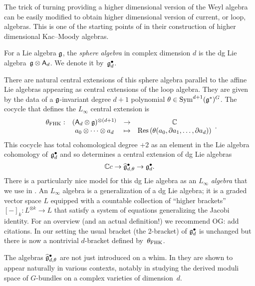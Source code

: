 \documentclass[11pt]{amsart}
\def\owen#1{{\textcolor{violet!50!black}{OG: {#1}}}}
\begin{document}
The trick of turning providing a higher dimensional version of the Weyl algebra can be easily modified to obtain higher dimensional version of current, or loop, algebras. 
This is one of the starting points of \cite{FHK} in their construction of higher dimensional Kac--Moody algebras. 

\begin{dfn}
\label{dfn:sphere}
For a Lie algebra $\mathfrak g$, the {\em sphere algebra} in complex dimension $d$ is the dg Lie algebra~$\mathfrak g \otimes \mathsf A_d$.
We denote it by~$\mathfrak g^\bullet_d$.
\end{dfn}

There are natural central extensions of this sphere algebra 
parallel to the affine Lie algebras appearing as central extensions of the loop algebra.
They are given by the data of a $\mathfrak g$-invariant degree $d+1$ polynomial $\theta \in \operatorname{Sym}^{d+1}(\mathfrak g^*)^G$.
The cocycle that defines the $L_\infty$ central extension is
\[
\label{fhk cocycle}
\begin{array}{cccc}
\theta_{\rm FHK} : & (\mathsf A_d \otimes \mathfrak g)^{\otimes (d+1)} & \to & \mathbb C\\ 
& a_0 \otimes \cdots \otimes a_d & \mapsto & {\rm Res} \left(\theta(a_0,\partial a_1,\ldots,\partial a_d)\right)
\end{array}.
\]
This cocycle has total cohomological degree $+2$ as an element in the Lie algebra cohomology of $\mathfrak g^\bullet_{d}$ and so determines a central extension of dg Lie algebras
\[
\mathbb C c \to \widehat{\mathfrak g}^\bullet_{d, \theta} \to \mathfrak g^\bullet_d .
\]
There is a particularly nice model for this dg Lie algebra as an $L_\infty$ \textit{algebra} that we use in \cite{GWkm}.
An $L_\infty$ algebra is a generalization of a dg Lie algebra;
it is a graded vector space $L$ equipped with a countable collection of ``higher brackets'' $[-]_k \colon L^{\otimes k} \to L$ that satisfy a system of equations generalizing the Jacobi identity.
For an overview (and an actual definition!) we recommend \owen{add citations}.
In our setting the usual bracket (the 2-bracket) of $\mathfrak g^\bullet_d$ is unchanged but there is now a nontrivial $d$-bracket defined by~$\theta_{\rm FHK}$.

The algebras $\widehat{\mathfrak g}^\bullet_{d, \theta}$ are not just introduced on a whim.
In \cite{FHK} they are shown to appear naturally in various contexts,
notably in studying the derived moduli space of $G$-bundles on a complex varieties of dimension~$d$.
\end{document}
